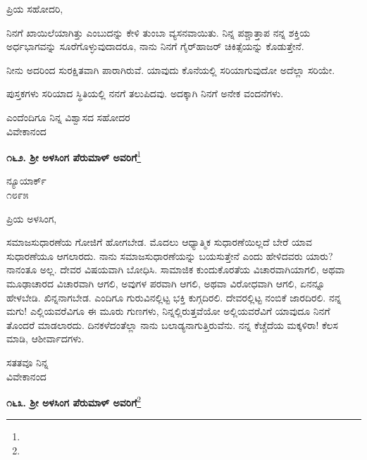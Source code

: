 \vspace{-0.5cm}

\noindent
ಪ್ರಿಯ ಸಹೋದರಿ,

ನಿನಗೆ ಖಾಯಿಲೆಯಾಗಿತ್ತು ಎಂಬುದನ್ನು ಕೇಳಿ ತುಂಬಾ ವ್ಯಸನವಾಯಿತು. ನಿನ್ನ ಪಶ್ಚಾತ್ತಾಪ ನನ್ನ ಶಕ್ತಿಯ ಅರ್ಧಭಾಗವನ್ನು ಸೂರೆಗೊಳ್ಳುವುದಾದರೂ, ನಾನು ನಿನಗೆ ಗೈರ್‌ಹಾಜರ್ ಚಿಕಿತ್ಸೆಯನ್ನು  ಕೊಡುತ್ತೇನೆ.

ನೀನು ಅದರಿಂದ ಸುರಕ್ಷಿತವಾಗಿ ಪಾರಾಗಿರುವೆ. ಯಾವುದು ಕೊನೆಯಲ್ಲಿ ಸರಿಯಾಗುವುದೋ ಅದೆಲ್ಲಾ ಸರಿಯೇ.

ಪುಸ್ತಕಗಳು ಸರಿಯಾದ ಸ್ಥಿತಿಯಲ್ಲಿ ನನಗೆ ತಲುಪಿದವು. ಅದಕ್ಕಾಗಿ ನಿನಗೆ ಅನೇಕ ವಂದನೆಗಳು.

\vspace{-0.5cm}

{\flushright
ಎಂದೆಂದಿಗೂ ನಿನ್ನ ವಿಶ್ವಾಸದ ಸಹೋದರ\\ವಿವೇಕಾನಂದ\par}

\begin{center}
\textbf{೧೬೨. ಶ‍್ರೀ ಅಳಸಿಂಗ ಪೆರುಮಾಳ್ ಅವರಿಗೆ}\footnote{}
\end{center}

\vspace{-0.5cm}

\begin{flushright}
ನ್ಯೂಯಾರ್ಕ್\\೧೮೯೫
\end{flushright}

\vspace{-0.5cm}

\noindent
ಪ್ರಿಯ ಅಳಸಿಂಗ,

ಸಮಾಜಸುಧಾರಣೆಯ ಗೋಜಿಗೆ ಹೋಗಬೇಡ. ಮೊದಲು ಆಧ್ಯಾತ್ಮಿಕ ಸುಧಾರಣೆಯಿಲ್ಲದೆ ಬೇರೆ ಯಾವ ಸುಧಾರಣೆಯೂ ಆಗಲಾರದು. ನಾನು ಸಮಾಜಸುಧಾರಣೆಯನ್ನು ಬಯಸುತ್ತೇನೆ ಎಂದು ಹೇಳಿದವರು ಯಾರು? ನಾನಂತೂ ಅಲ್ಲ. ದೇವರ ವಿಷಯವಾಗಿ ಬೋಧಿಸಿ. ಸಾಮಾಜಿಕ ಕುಂದುಕೊರತೆಯ ವಿಚಾರವಾಗಿಯಾಗಲಿ, ಅಥವಾ ಮೂಢಾಚಾರದ ವಿಚಾರವಾಗಿ ಆಗಲಿ, ಅವುಗಳ ಪರವಾಗಿ ಆಗಲಿ, ಅಥವಾ ವಿರೋಧವಾಗಿ ಆಗಲಿ, ಏನನ್ನೂ ಹೇಳಬೇಡಿ. ಖಿನ್ನನಾಗಬೇಡ. ಎಂದಿಗೂ ಗುರುವಿನಲ್ಲಿಟ್ಟ ಭಕ್ತಿ ಕುಗ್ಗದಿರಲಿ. ದೇವರಲ್ಲಿಟ್ಟ ನಂಬಿಕೆ ಜಾರದಿರಲಿ. ನನ್ನ ಮಗು! ಎಲ್ಲಿಯವರೆವಿಗೂ ಈ ಮೂರು ಗುಣಗಳು, ನಿನ್ನಲ್ಲಿರುತ್ತವೆಯೋ ಅಲ್ಲಿಯವರೆವಿಗೆ ಯಾವುದೂ ನಿನಗೆ ತೊಂದರೆ ಮಾಡಲಾರದು. ದಿನಕಳೆದಂತೆಲ್ಲಾ ನಾನು ಬಲಾಡ್ಯನಾಗುತ್ತಿರುವೆನು. ನನ್ನ ಕೆಚ್ಚೆದೆಯ ಮಕ್ಕಳಿರಾ! ಕೆಲಸ ಮಾಡಿ, ಆಶೀರ್ವಾದಗಳು.

\vspace{-0.5cm}

{\flushright
ಸತತವೂ ನಿನ್ನ\\ವಿವೇಕಾನಂದ\par}

\begin{center}
\textbf{೧೬೩. ಶ‍್ರೀ ಅಳಸಿಂಗ ಪೆರುಮಾಳ್ ಅವರಿಗೆ}\footnote{}
\end{center}

